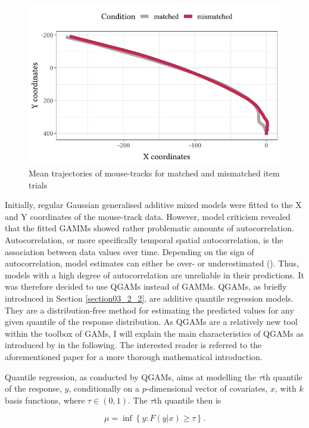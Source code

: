 \begin{figure}
    \centering
    \includegraphics[]{figures/fig7.8.pdf}
    \caption{Mean trajectories of mouse-tracks for matched and mismatched item trials}
    \label{fig:7_8}
\end{figure}

Initially, regular Gaussian generalised additive mixed models were fitted to the X and Y coordinates of the mouse-track data. However, model criticism revealed that the fitted GAMMs showed rather problematic amounts of autocorrelation. Autocorrelation, or more specifically temporal spatial autocorrelation, is the association between data values over time. Depending on the sign of autocorrelation, model estimates can either be over- or underestimated (\cite{Charlton2009}). Thus, models with a high degree of autocorrelation are unreliable in their predictions. It was therefore decided to use QGAMs instead of GAMMs. QGAMs, as briefly introduced in Section \ref{section03_2_2}, are additive quantile regression models. They are a distribution-free method for estimating the predicted values for any given quantile of the response distribution. As QGAMs are a relatively new tool within the toolbox of GAMs, I will explain the main characteristics of QGAMs as introduced by \citet{Fasiolo2021} in the following. The interested reader is referred to the aforementioned paper for a more thorough mathematical introduction. 

Quantile regression, as conducted by QGAMs, aims at modelling the $\tau$th quantile of the response, $y$, conditionally on a $p$-dimensional vector of covariates, $x$, with $k$ basis functions, where $\tau \in (0,1)$. The $\tau$th quantile then is 

\begin{equation}
\label{eq:mu}
    \mu=\inf \left \{ y:F(y|x)\geq \tau \right \}.
\end{equation}

